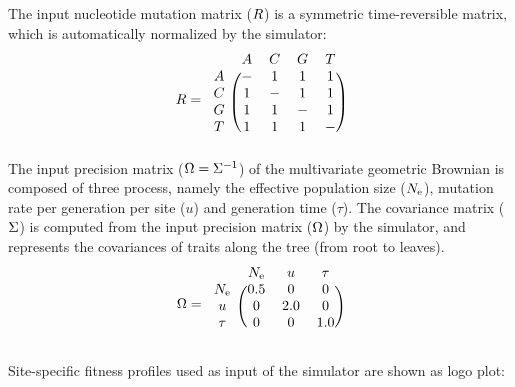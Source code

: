 \documentclass{article}
\begin{document}
	The input nucleotide mutation matrix ($R$) is a symmetric time-reversible matrix, which is automatically normalized by the simulator:
	\begin{equation}
		\Mutmatrix =
		\begin{blockarray}{ccccc}
			& A & C & G & T \\
			\begin{block}{c(cccc)}
				A & - & 1 & 1 & 1 \\
				C & 1 & - & 1 & 1 \\
				G & 1 & 1 & - & 1 \\
				T & 1 & 1 & 1 & - \\
			\end{block}
		\end{blockarray}
	\end{equation}
	The input precision matrix ($\Omega = \Sigma^{-1}$) of the multivariate geometric Brownian is composed of three process, namely the effective population size ($N_{\text{e}}$), mutation rate per generation per site ($u$) and generation time ($\tau$).
	The covariance matrix ($\Sigma$) is computed from the input precision matrix ($\Omega$) by the simulator, and represents the covariances of traits along the tree (from root to leaves).
	\begin{equation}
		\PrecisionMatrix =
		\begin{blockarray}{cccc}
			& \Ne & u & \tau \\
			\begin{block}{c(ccc)}
				\Ne  & 0.5 & 0 & 0 \\
				u    & 0 & 2.0 & 0 \\
				\tau & 0 & 0 & 1.0 \\
			\end{block}
		\end{blockarray}
	\end{equation}

	Site-specific fitness profiles used as input of the simulator are shown as logo plot:
	
	
\end{document}
